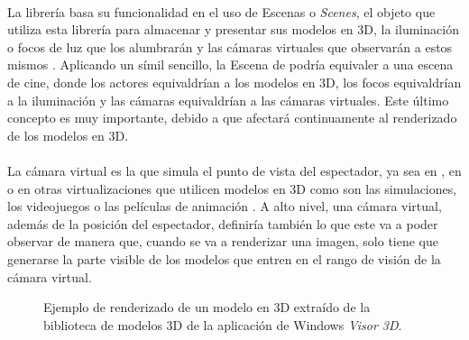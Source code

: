 \documentclass{subfiles}
\begin{document}
        \paragraph{}
        La librería \threejs basa su funcionalidad en el uso de Escenas o \textit{Scenes}, el objeto que utiliza esta librería para almacenar y presentar sus modelos en 3D, la iluminación o focos de luz que los alumbrarán y las cámaras virtuales que observarán a estos mismos \cite{web:threejs_scene}. Aplicando un símil sencillo, la Escena de \threejs podría equivaler a una escena de cine, donde los actores equivaldrían a los modelos en 3D, los focos equivaldrían a la iluminación y las cámaras equivaldrían a las cámaras virtuales. Este último concepto es muy importante, debido a que afectará continuamente al renderizado de los modelos en 3D.

        \paragraph{}
        La cámara virtual es la que simula el punto de vista del espectador, ya sea en \ra, en \rv o en otras virtualizaciones que utilicen modelos en 3D como son las simulaciones, los videojuegos o las películas de animación \cite{web:mozilla_virtualcamera}. A alto nivel, una cámara virtual, además de la posición del espectador, definiría también lo que este va a poder observar de manera que, cuando se va a renderizar una imagen, solo tiene que generarse la parte visible de los modelos que entren en el rango de visión de la cámara virtual.

        \begin{figure}
        \centering
        \caption[Ejemplo de renderizado de un modelo en 3D.]{Ejemplo de renderizado de un modelo en 3D extraído de la biblioteca de modelos 3D de la aplicación de Windows \textit{Visor 3D}.}
        \label{fig:tortuga_marina}
        \end{figure}
\end{document}
